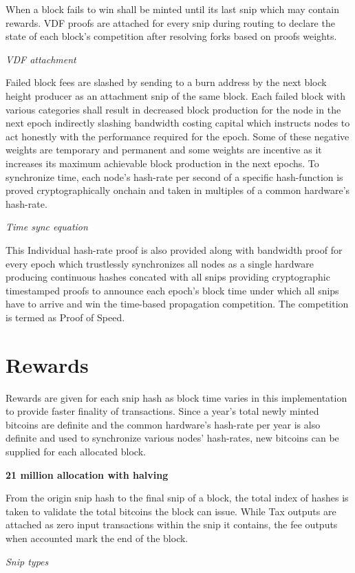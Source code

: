 \documentclass[a4paper,10pt]{article}
\begin{document}
When a block fails to win shall be minted until its last snip which may contain rewards. VDF proofs are attached for every snip during routing to declare the state of each block's competition after resolving forks based on proofs weights. 

\textit{VDF attachment}

Failed block fees are slashed by sending to a burn address by the next block height producer as an attachment snip of the same block. Each failed block with various categories shall result in decreased block production for the node in the next epoch indirectly slashing bandwidth costing capital which instructs nodes to act honestly with the performance required for the epoch. Some of these negative weights are temporary and permanent and some weights are incentive as it increases its maximum achievable block production in the next epochs. To synchronize time, each node's hash-rate per second of a specific hash-function is proved cryptographically onchain and taken in multiples of a common hardware's hash-rate. 

\textit{Time sync equation}

This Individual hash-rate proof is also provided along with bandwidth proof for every epoch which trustlessly synchronizes all nodes as a single hardware producing continuous hashes concated with all snips providing cryptographic timestamped proofs to announce each epoch's block time under which all snips have to arrive and win the time-based propagation competition. The competition is termed as Proof of Speed.
\section{Rewards}
Rewards are given for each snip hash as block time varies in this implementation to provide faster finality of transactions. Since a year's total newly minted bitcoins are definite and the common hardware's hash-rate per year is also definite and used to synchronize various nodes' hash-rates, new bitcoins can be supplied for each allocated block. 

\textbf{21 million allocation with halving}

From the origin snip hash to the final snip of a block, the total index of hashes is taken to validate the total bitcoins the block can issue. While Tax outputs are attached as zero input transactions within the snip it contains, the fee outputs when accounted mark the end of the block. 

\textit{Snip types}
\end{document}
